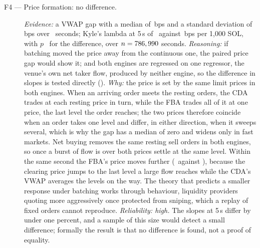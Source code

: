 \begin{description}
  \item[F4 --- Price formation: no difference.] \emph{Evidence:} a VWAP
  gap with a median of \PriceDiffMedianBps\,bps and a standard deviation
  of \PriceDiffStdBps\,bps over \PriceDiffN\ seconds; Kyle's lambda at
  5\,s of \ResCommonFlowLambdaFiveSCda\ against
  \ResCommonFlowLambdaFiveSFba\,bps per 1{,}000 SOL, with $p$
  \ResCommonFlowLambdaFiveSP\ for the difference, over
  $n = 786,990$ seconds. \emph{Reasoning:} if
  batching moved the price away from the continuous one, the paired price
  gap would show it; and both engines are regressed on one regressor, the
  venue's own net taker flow, produced by neither engine, so the
  difference in slopes is tested directly ().
  \emph{Why:} the price is set by the same limit prices in both engines.
  When an arriving order meets the resting orders, the CDA trades at each
  resting price in turn, while the FBA trades all of it at one price, the
  last level the order reaches; the two prices therefore coincide when an
  order takes one level and differ, in either direction, when it sweeps
  several, which is why the gap has a median of zero and widens only in
  fast markets. Net buying removes the same resting sell orders in both
  engines, so once a burst of flow is over both prices settle at the same
  level. Within the same second the FBA's price moves further
  (\ResCommonFlowLambdaFba\ against \ResCommonFlowLambdaCda), because the
  clearing price jumps to the last level a large flow reaches while the
  CDA's VWAP averages the levels on the way. The theory that predicts a
  smaller response under batching works through behaviour, liquidity
  providers quoting more aggressively once protected from sniping, which a
  replay of fixed orders cannot reproduce. \emph{Reliability: high.} The
  slopes at 5\,s differ by under one percent, and a sample of this size
  would detect a small difference; formally the result is that no
  difference is found, not a proof of equality.


\end{description}
